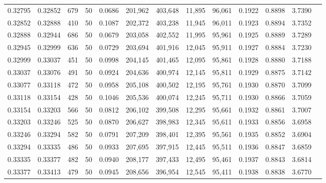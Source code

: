 \begin{tabular}{rrrrrrrrrrrrr}
0.32795 & 0.32852 &   679 &  50 &                                     0.0686 & 201,962 & 403,648 &  11,895 &  96,061 & 0.1922 & 0.8898 & 3.7390 \\
0.32852 & 0.32888 &   410 &  50 &                                     0.1087 & 202,372 & 403,238 &  11,945 &  96,011 & 0.1923 & 0.8894 & 3.7352 \\
0.32888 & 0.32944 &   686 &  50 &                                     0.0679 & 203,058 & 402,552 &  11,995 &  95,961 & 0.1925 & 0.8889 & 3.7289 \\
0.32945 & 0.32999 &   636 &  50 &                                     0.0729 & 203,694 & 401,916 &  12,045 &  95,911 & 0.1927 & 0.8884 & 3.7230 \\
0.32999 & 0.33037 &   451 &  50 &                                     0.0998 & 204,145 & 401,465 &  12,095 &  95,861 & 0.1928 & 0.8880 & 3.7188 \\
0.33037 & 0.33076 &   491 &  50 &                                     0.0924 & 204,636 & 400,974 &  12,145 &  95,811 & 0.1929 & 0.8875 & 3.7142 \\
0.33077 & 0.33118 &   472 &  50 &                                     0.0958 & 205,108 & 400,502 &  12,195 &  95,761 & 0.1930 & 0.8870 & 3.7099 \\
0.33118 & 0.33154 &   428 &  50 &                                     0.1046 & 205,536 & 400,074 &  12,245 &  95,711 & 0.1930 & 0.8866 & 3.7059 \\
0.33154 & 0.33203 &   566 &  50 &                                     0.0812 & 206,102 & 399,508 &  12,295 &  95,661 & 0.1932 & 0.8861 & 3.7007 \\
0.33203 & 0.33246 &   525 &  50 &                                     0.0870 & 206,627 & 398,983 &  12,345 &  95,611 & 0.1933 & 0.8856 & 3.6958 \\
0.33246 & 0.33294 &   582 &  50 &                                     0.0791 & 207,209 & 398,401 &  12,395 &  95,561 & 0.1935 & 0.8852 & 3.6904 \\
0.33294 & 0.33335 &   486 &  50 &                                     0.0933 & 207,695 & 397,915 &  12,445 &  95,511 & 0.1936 & 0.8847 & 3.6859 \\
0.33335 & 0.33377 &   482 &  50 &                                     0.0940 & 208,177 & 397,433 &  12,495 &  95,461 & 0.1937 & 0.8843 & 3.6814 \\
0.33377 & 0.33413 &   479 &  50 &                                     0.0945 & 208,656 & 396,954 &  12,545 &  95,411 & 0.1938 & 0.8838 & 3.6770 \\

\end{tabular}

